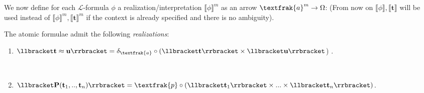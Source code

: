 We now define for each $\mathcal{L}$-formula $\phi$ a realization/interpretation $\llbracket  \phi \rrbracket^m$ as an arrow $\textfrak{a}^m \rightarrow \Omega$:
\newline
(From now on $\llbracket  \phi \rrbracket, \llbracket  \textbf{t} \rrbracket $  will be used instead of $\llbracket  \phi \rrbracket^m, \llbracket  \textbf{t} \rrbracket^m$ if the context is already specified and there is no ambiguity).

\begin{definition}[$\llbracket  \phi \rrbracket$]
	The atomic formulae admit the following \emph{realizations}:
	\begin{enumerate}
			\item $\llbracket \textbf{t} \approx \textbf{u}  \rrbracket = \delta_\textfrak{a} \circ (\llbracket \textbf{t} \rrbracket \times \llbracket \textbf{u} \rrbracket$)  .
			\begin{figure}[h]
					\centering
					\
				\end{figure}
			
			\item $\llbracket \textbf{P}(\textbf{t}_1,..,\textbf{t}_n) \rrbracket = \textfrak{p} \circ (\llbracket \textbf{t}_1 \rrbracket \times ...\times\llbracket \textbf{t}_n \rrbracket)$.
			\begin{figure}[h]
					\centering
				\end{figure}
			

\end{enumerate}
\end{definition}
